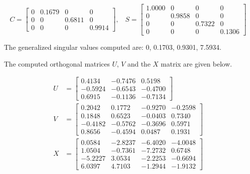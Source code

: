 \begin{enumerate}[(1).]
            \begin{equation*}
                C = \begin{bmatrix}
                     0   & 0.1679  &       0  &       0 \\
                     0   &      0  &  0.6811  &       0 \\
                     0   &      0  &       0  &  0.9914
                \end{bmatrix}, \ \ \ \
                S = \begin{bmatrix}
                    1.0000  &       0  &       0  &       0 \\
                         0  &  0.9858  &       0  &       0 \\
                         0  &       0  &  0.7322  &       0 \\
                         0  &       0  &       0  &  0.1306
                \end{bmatrix}
            \end{equation*}
    
            The generalized singular values computed are: 0, 0.1703, 0.9301, 7.5934.
            
            The computed orthogonal matrices $U$, $V$ and the $X$ matrix are given below.
    
            \begin{align*}
                U &= \begin{bmatrix}
                    0.4134 &  -0.7476 &   0.5198 \\
                   -0.5924 &  -0.6543 &  -0.4700 \\
                    0.6915 &  -0.1136 &  -0.7134
                \end{bmatrix} \\
                V &= \begin{bmatrix}
                    0.2042 &   0.1772 &  -0.9270 &  -0.2598 \\
                    0.1848 &   0.6523 &  -0.0403 &   0.7340 \\
                   -0.4182 &  -0.5762 &  -0.3696 &   0.5971 \\
                    0.8656 &  -0.4594 &   0.0487 &   0.1931
                \end{bmatrix} \\
                X &= \begin{bmatrix}
                    0.0584 &  -2.8237  & -6.4020 &  -4.0048 \\
                    1.0504 &  -0.7361  & -7.2732 &   0.6748 \\
                   -5.2227 &   3.0534  & -2.2253 &  -0.6694 \\ 
                    6.0397 &   4.7103  & -1.2944 &  -1.9132
                \end{bmatrix} 
            \end{align*} 
            

\end{enumerate}
